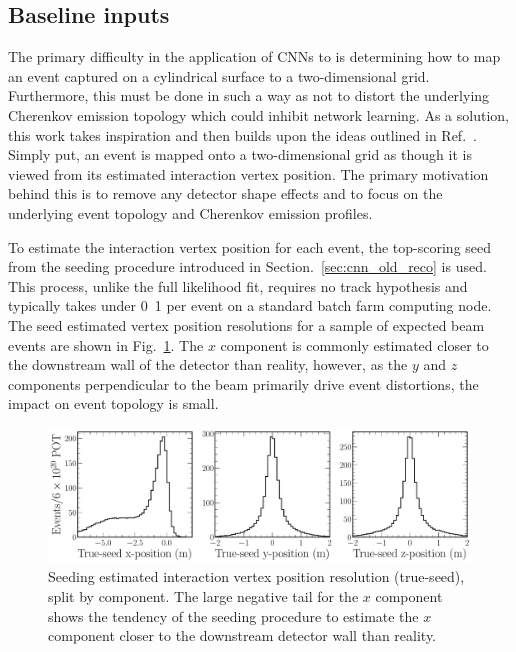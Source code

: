 \subsection{Baseline inputs} %
\label{sec:cnn_baseline_inputs} %

The primary difficulty in the application of CNNs to \chips is determining how to map an event
captured on a cylindrical surface to a two-dimensional grid. Furthermore, this must be done in
such a way as not to distort the underlying Cherenkov emission topology which could inhibit
network learning. As a solution, this work takes inspiration and then builds upon the ideas
outlined in Ref.~\cite{theodore2016}. Simply put, an event is mapped onto a two-dimensional grid
as though it is viewed from its estimated interaction vertex position. The primary motivation
behind this is to remove any detector shape effects and to focus on the underlying event topology
and Cherenkov emission profiles.

To estimate the interaction vertex position for each event, the top-scoring seed from the seeding
procedure introduced in Section.~\ref{sec:cnn_old_reco} is used. This process, unlike the full
likelihood fit, requires no track hypothesis and typically takes under \unit{0.1}{}
per event on a standard batch farm computing node. The seed estimated vertex position resolutions
for a sample of expected beam events are shown in Fig.~\ref{fig:explore_true_reco_vtx}. The $x$
component is commonly estimated closer to the downstream wall of the detector than reality,
however, as the $y$ and $z$ components perpendicular to the beam primarily drive event
distortions, the impact on event topology is small.

\begin{figure} %
    \includegraphics[width=\textwidth]{diagrams/7-results/explore_true_reco_vtx.pdf}
    \caption[Seeding estimated interaction vertex position resolutions]
    {Seeding estimated interaction vertex position resolution (true-seed), split by component. The
        large negative tail for the $x$ component shows the tendency of the seeding procedure to
        estimate the $x$ component closer to the downstream detector wall than reality.}
    \label{fig:explore_true_reco_vtx}
\end{figure}

